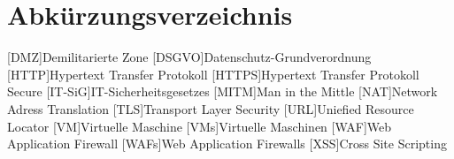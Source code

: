 \tableofcontents
\pagebreak

\section{Abkürzungsverzeichnis} 

\begin{acronym}
    [DMZ]{Demilitarierte Zone}
    [DSGVO]{Datenschutz-Grundverordnung}
    [HTTP]{Hypertext Transfer Protokoll}
    [HTTPS]{Hypertext Transfer Protokoll Secure}
    [IT-SiG]{IT-Sicherheitsgesetzes}
    [MITM]{Man in the Mittle}
    [NAT]{Network Adress Translation}
    [TLS]{Transport Layer Security}
    [URL]{Uniefied Resource Locator}
    [VM]{Virtuelle Maschine}
    [VMs]{Virtuelle Maschinen}
    [WAF]{Web Application Firewall}
    [WAFs]{Web Application Firewalls}
    [XSS]{Cross Site Scripting}
\end{acronym}

\pagebreak

\listoffigures

\pagebreak